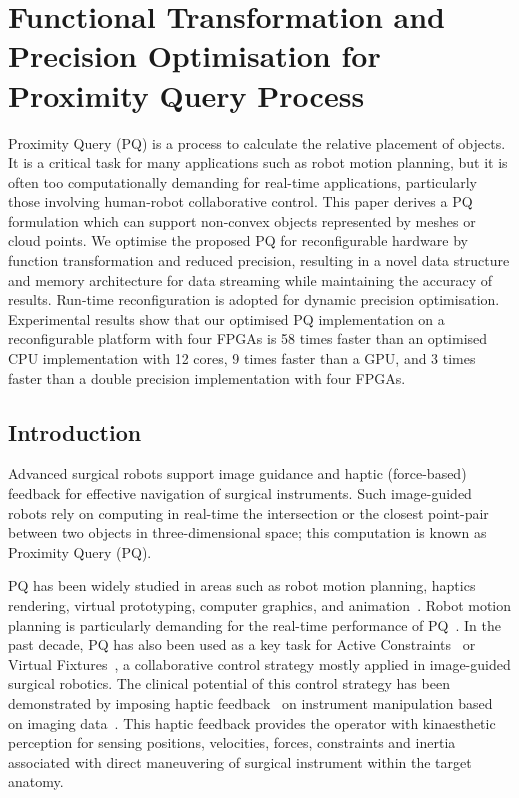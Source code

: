 
\chapter[Functional Transformation \& Precision Optimisation for PQ Process]{Functional Transformation and Precision Optimisation for Proximity Query Process}

Proximity Query (PQ) is a process to calculate the relative placement of objects. It is a critical task for many applications such as robot motion planning, but it is often too computationally demanding for real-time applications, particularly those involving human-robot collaborative control. This paper derives a PQ formulation which can support non-convex objects represented by meshes or cloud points. We optimise the proposed PQ for reconfigurable hardware by function transformation and reduced precision, resulting in a novel data structure and memory architecture for data streaming while maintaining the accuracy of results. Run-time reconfiguration is adopted for dynamic precision optimisation. Experimental results show that our optimised PQ implementation on a reconfigurable platform with four FPGAs is 58 times faster than an optimised CPU implementation with 12 cores, 9 times faster than a GPU, and 3 times faster than a double precision implementation with four FPGAs.

\section{Introduction}
\label{sec:intro}

Advanced surgical robots support image guidance and haptic (force-based) feedback for effective navigation of surgical instruments. 
Such image-guided robots rely on computing in real-time the intersection or the closest point-pair
between two objects in three-dimensional space; 
this computation is known as Proximity Query (PQ).

PQ has been widely studied in areas such as robot motion planning, haptics rendering, virtual prototyping, computer graphics, and animation~\cite{gilbert90}.
Robot motion planning is particularly demanding for the real-time performance of PQ~\cite{chakraborty08}. 
In the past decade, PQ has also been used as a key task for Active Constraints~\cite{kwok10} or Virtual Fixtures~\cite{li07}, 
a collaborative control strategy mostly applied in image-guided surgical robotics. 
The clinical potential of this control strategy has been demonstrated by imposing haptic feedback~\cite{constantinescu05} on instrument manipulation based on imaging data~\cite{jakopec03}.
This haptic feedback provides the operator with kinaesthetic perception for sensing positions, velocities, forces, constraints and inertia associated with direct maneuvering of surgical
instrument within the target anatomy.

